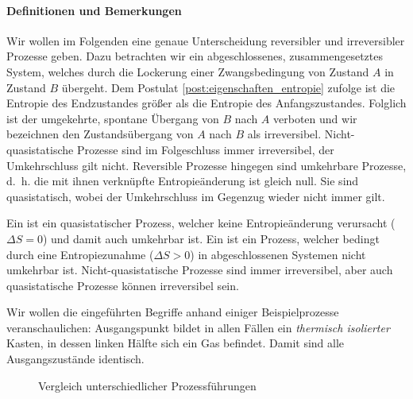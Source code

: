 \paragraph*{Definitionen und Bemerkungen }
Wir wollen im Folgenden eine genaue Unterscheidung reversibler und irreversibler Prozesse geben. 
Dazu betrachten wir ein abgeschlossenes, zusammengesetztes System, welches durch die Lockerung einer Zwangsbedingung von Zustand $A$
in Zustand $B$ übergeht. Dem Postulat \ref{post:eigenschaften_entropie} zufolge ist die Entropie des Endzustandes größer als die Entropie des Anfangszustandes.
Folglich ist der umgekehrte, spontane Übergang von $B$ nach $A$ verboten und wir bezeichnen den Zustandsübergang von $A$ nach $B$ als irreversibel. Nicht-quasistatische Prozesse sind im Folgeschluss immer irreversibel, der Umkehrschluss gilt nicht.
Reversible Prozesse hingegen sind umkehrbare Prozesse, d.~h. die mit ihnen verknüpfte Entropieänderung ist gleich null.
Sie sind quasistatisch, wobei der Umkehrschluss im Gegenzug wieder nicht immer gilt. %
\begin{formal}
    Ein  ist ein quasistatischer Prozess, welcher keine Entropieänderung verursacht ($\Delta S=0$) und damit auch umkehrbar ist. 
    Ein  ist ein Prozess, welcher bedingt durch eine Entropiezunahme ($\Delta S>0$) in abgeschlossenen Systemen nicht umkehrbar ist. Nicht-quasistatische Prozesse sind immer irreversibel, aber auch quasistatische Prozesse können irreversibel sein.
\end{formal}
Wir wollen die eingeführten Begriffe anhand einiger Beispielprozesse veranschaulichen:
Ausgangspunkt bildet in allen Fällen ein \emph{thermisch isolierter} Kasten, in dessen linken Hälfte sich ein Gas befindet. Damit sind alle Ausgangszustände identisch.
\begin{figure}[htbp]
    \centering
    \begin{subfigure}[b]{.32\textwidth}
        \centering
        \tfigProcessReversibleQuasistationary        
        \caption{}
        \label{fig:ProcessReversibleQuasistationary}
    \end{subfigure}
    \begin{subfigure}[b]{.32\textwidth}
        \centering
        \tfigProcessIrreversibleQuasistationary           
        \caption{}
        \label{fig:ProcessIrreversibleQuasistationary}
    \end{subfigure}
    \begin{subfigure}[b]{.32\textwidth}
        \centering     
        \tfigProcessIrreversibleNonquasistationary
        \caption{}
        \label{fig:ProcessIrreversibleNonquasistationary}
    \end{subfigure}
    \caption{Vergleich unterschiedlicher Prozessführungen}
    \label{fig:ProcessReversibleIrreversibleQuasistationary}
\end{figure}
